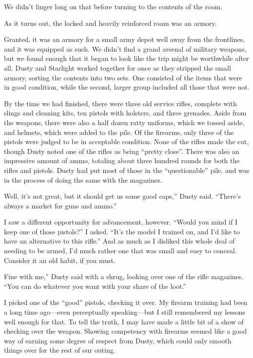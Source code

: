 We didn’t linger long on that before turning to the contents of the room.

As it turns out, the locked and heavily reinforced room was an armory.

Granted, it was an armory for a small army depot well away from the frontlines, and it was equipped as such. We didn’t find a grand arsenal of military weapons, but we found enough that it began to look like the trip might be worthwhile after all. Dusty and Starlight worked together for once as they stripped the small armory, sorting the contents into two sets. One consisted of the items that were in good condition, while the second, larger group included all those that were not.

By the time we had finished, there were three old service rifles, complete with slings and cleaning kits, ten pistols with holsters, and three grenades. Aside from the weapons, there were also a half dozen ratty uniforms, which we tossed aside, and helmets, which were added to the pile. Of the firearms, only three of the pistols were judged to be in acceptable condition. None of the rifles made the cut, though Dusty noted one of the rifles as being “pretty close”. There was also an impressive amount of ammo, totaling about three hundred rounds for both the rifles and pistols. Dusty had put most of those in the “questionable” pile, and was in the process of doing the same with the magazines.

\leavevmode{}Well, it’s not great, but it should get us some good caps,” Dusty said. “There’s always a market for guns and ammo.”

I saw a different opportunity for advancement, however. “Would you mind if I keep one of those pistols?” I asked. “It’s the model I trained on, and I’d like to have an alternative to this rifle.” And as much as I disliked this whole deal of needing to be armed, I’d much rather one that was small and easy to conceal. Consider it an old habit, if you must.

\leavevmode{}Fine with me,” Dusty said with a shrug, looking over one of the rifle magazines. “You can do whatever you want with your share of the loot.”

I picked one of the “good” pistols, checking it over. My firearm training had been a long time ago—even perceptually speaking—but I still remembered my lessons well enough for that. To tell the truth, I may have made a little bit of a show of checking over the weapon. Showing competency with firearms seemed like a good way of earning some degree of respect from Dusty, which could only smooth things over for the rest of our outing.

